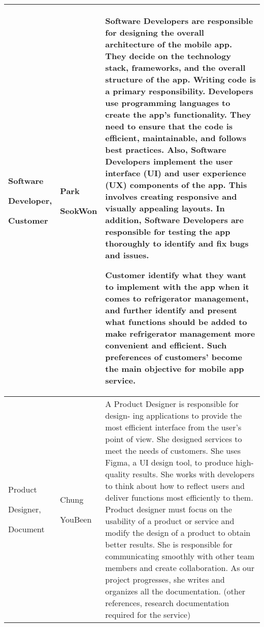 \documentclass[conference]{IEEEtran}
\begin{document}
\begin{table}
\begin{tabular}{| p{1.7cm}|p{1.5cm}|p{4.3cm} |}
\hline
Software  \par Developer,  \par Customer 
& Park \par SeokWon 
& Software	 Developers are responsible for designing the overall architecture of the mobile app. They decide on the technology stack, frameworks, and the overall structure of the app.
Writing code is a primary responsibility. Developers use programming languages to create the app's functionality. They need to ensure that the code is efficient, maintainable, and follows best practices. Also, Software Developers implement the user interface (UI) and user experience (UX) components of the app. This involves creating responsive and visually appealing layouts. In addition, Software Developers are responsible for testing the app thoroughly to identify and fix bugs and issues.
\par Customer identify what they want to implement with the app when it comes to refrigerator management, and further identify and present what functions should be added to make refrigerator management more convenient and efficient. Such preferences of customers’ become the main objective for mobile app service. \\
\hline
Product \par Designer,\par Document
& Chung \par YouBeen 
& A Product Designer is responsible for design- ing applications to provide the most efficient interface from the user’s point of view. 
She designed services to meet the needs of customers. She uses Figma, a UI design tool, to produce high-quality results.
 She works with developers to think about how to reflect users and deliver functions most efficiently to them.
Product designer must focus on the usability of a product or service and modify the design of a product to obtain better results. 
She is responsible for communicating smoothly with other team members and create collaboration.
 As our project progresses, she writes and organizes all the documentation.
(other references, research documentation required for the service)
 \\
\hline
\end{tabular}
\end{table}
\end{document}

